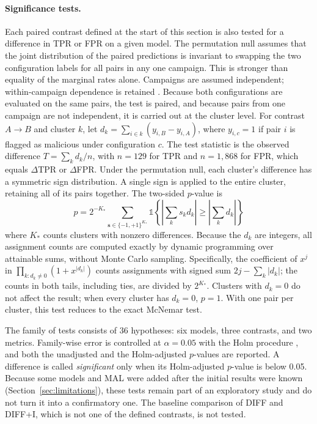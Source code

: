 \documentclass[a4paper,fleqn]{cas-dc}
\begin{document}
\paragraph{Significance tests.} Each paired contrast defined at the start of
this section is also tested for a difference in TPR or FPR on a given model.
The permutation null assumes that the joint distribution of the paired
predictions is invariant to swapping the two configuration labels for all
pairs in any one campaign. This is stronger than equality of the marginal
rates alone. Campaigns are assumed independent; within-campaign dependence is
retained \citep{winkler2014permutation}. Because both
configurations are evaluated on the same pairs, the test is paired, and because
pairs from one campaign are not independent, it is carried out at the cluster
level. For contrast $A \rightarrow B$ and cluster $k$, let
$d_k = \sum_{i \in k} (y_{i,B} - y_{i,A})$, where $y_{i,c}=1$ if pair $i$ is
flagged as malicious under configuration $c$. The test statistic is the observed
difference $T = \sum_k d_k / n$, with $n=129$ for TPR and $n=1{,}868$ for FPR,
which equals $\Delta$TPR or $\Delta$FPR. Under the permutation null, each
cluster's difference has a symmetric sign distribution. A single sign is
applied to the entire cluster, retaining all of its pairs together. The
two-sided $p$-value is
\begin{equation}
p = 2^{-K_*}\sum_{\boldsymbol{s}\in\{-1,+1\}^{K_*}}
\mathbb{1}\!\left\{\left|\sum_k s_k d_k\right|
\geq \left|\sum_k d_k\right|\right\}
\end{equation}
where $K_*$ counts clusters with nonzero differences. Because the $d_k$ are
integers, all assignment counts are computed exactly by dynamic programming
over attainable sums, without Monte Carlo sampling. Specifically, the
coefficient of $x^j$ in $\prod_{k:d_k\ne0}(1+x^{|d_k|})$ counts assignments
with signed sum $2j-\sum_k|d_k|$; the counts in both tails, including ties,
are divided by $2^{K_*}$.
Clusters with $d_k = 0$ do not affect the result; when every cluster has
$d_k = 0$, $p = 1$. With one pair per cluster, this test
reduces to the exact McNemar test.

The family of tests consists of 36 hypotheses: six models, three contrasts, and
two metrics. Family-wise error is controlled at $\alpha = 0.05$ with the Holm
procedure \citep{holm1979simple}, and both the unadjusted and the Holm-adjusted
$p$-values are reported. A difference is called \emph{significant} only when its
Holm-adjusted $p$-value is below 0.05. Because some models and MAL were added
after the initial results were known (Section~\ref{sec:limitations}), these tests
remain part of an exploratory study and do not turn it into a confirmatory one.
The baseline comparison of DIFF and DIFF+I, which is not one of the defined
contrasts, is not tested.
\end{document}
